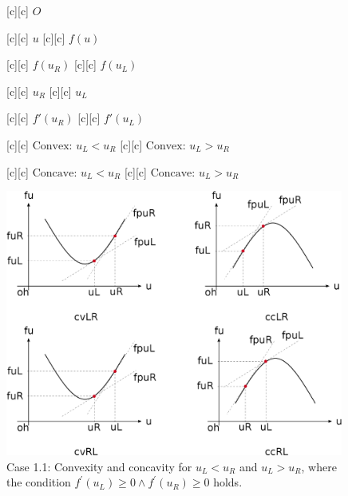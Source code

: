 \begin{figure}[ht]
	\centering
	\footnotesize

	[c] {$O$}

	[c] {$u$}
	[c] {$f(u)$}

	[c] {$f(u_{R})$}
	[c] {$f(u_{L})$}

	[c] {$u_{R}$}
	[c] {$u_{L}$}

	[c] {$f'(u_{R})$}
	[c] {$f'(u_{L})$}

	[c] {$\text{Convex: } u_{L} < u_{R}$}
	[c] {$\text{Convex: } u_{L} > u_{R}$}

	[c] {$\text{Concave: } u_{L} < u_{R}$}
	[c] {$\text{Concave: } u_{L} > u_{R}$}

	\includegraphics[width=0.99\textwidth]{convexityfu_case11.eps}
	\caption{Case 1.1:
		Convexity and concavity for $u_{L} < u_{R}$ and $u_{L} > u_{R}$,
		where the condition $f^\prime(u_L) \geq 0 \wedge  f^\prime(u_R) \geq 0$ holds.}
	\label{\LABEL}
\end{figure}